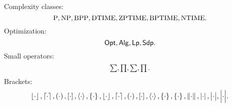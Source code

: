  Complexity classes:
 \begin{equation}
    \P, \NP, \BPP, \DTIME, \ZPTIME, \BPTIME, \NTIME. 
 \end{equation}
 Optimization:
 \begin{equation}
    \Opt, \Alg, \Lp, \Sdp. 
 \end{equation}
 Small operators:
 \begin{equation}
    \littlesum, \littleprod, \littlesumx, \littleprodx. 
 \end{equation}
 Brackets:
 \begin{equation}
    \fbr{\cdot}, \cbr{\cdot}, \rbr{\cdot}, \sbr{\cdot}, \abr{\cdot}, \nbr{\cdot}, \floorbr{\cdot}, \ceilingbr{\cdot}, \roundbr{\cdot}, \squarebr{\cdot}, \anglebr{\cdot}, \normbr{\cdot}, \curlybr{\cdot}, \absbr{\cdot}, \abs{\cdot}, \bigabs{\cdot}, \Bigabs{\cdot}. 
 \end{equation}
